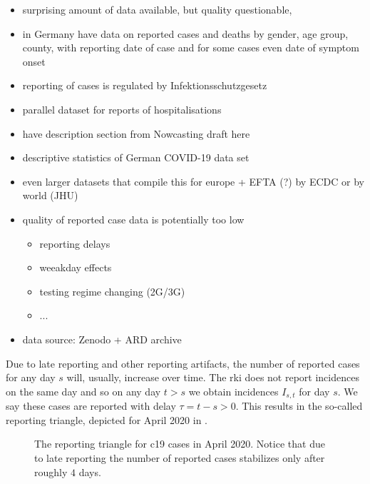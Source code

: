 \begin{itemize}
    \item surprising amount of data available, but quality questionable, 
    \item in Germany have data on reported cases and deaths by gender, age group, county, with reporting date of case and for some cases even date of symptom onset
    \item reporting of cases is regulated by Infektionsschutzgesetz
    \item parallel dataset for reports of hospitalisations 
    \item have description section from Nowcasting draft here
    \item descriptive statistics of German COVID-19 data set
    \item even larger datasets that compile this for europe + EFTA (?) by ECDC or by world (JHU)
    \item quality of reported case data is potentially too low 
    \begin{itemize}
        \item reporting delays
        \item weeakday effects
        \item testing regime changing (2G/3G)
        \item ...
    \end{itemize}
    \item data source: Zenodo + ARD archive
\end{itemize}


Due to late reporting and other reporting artifacts, the number of reported cases for any day $s$ will, usually, increase over time. The \acrshort{rki} does not report incidences on the same day and so on any day $t > s$ we obtain incidences $I_{s,t}$ for day $s$. We say these cases are reported with delay $\tau = t -s > 0$. This results in the so-called reporting triangle, depicted for April 2020 in . 

\begin{figure}
    \resizebox{\textwidth}{!}{%
    }
    \caption{The reporting triangle for \acrshort{c19} cases in April 2020. Notice that due to late reporting the number of reported cases stabilizes only after roughly $4$ days.}
    \label{fig:reporting_delays_cases}
\end{figure}

